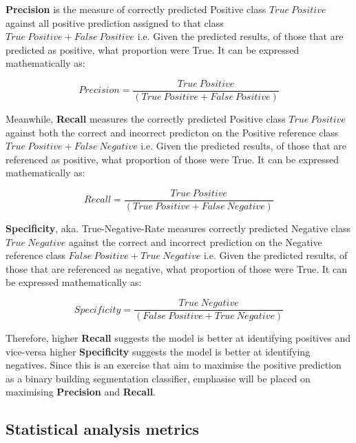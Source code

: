 \documentclass[11pt, a4paper, twoside]{report}
\begin{document}
\textbf{Precision} is the measure of correctly predicted Positive class $True\ Positive$ against all positive prediction assigned to that class $True\ Positive + False\ Positive$ i.e. Given the predicted results, of those that are predicted as positive, what proportion were True. It can be expressed mathematically as:

\begin{equation}
  Precision = \frac{True\ Positive} {(True\ Positive + False\ Positive)}
\end{equation}

Meanwhile, \textbf{Recall} measures the correctly predicted Positive class $True\ Positive$ against both the correct and incorrect predicton on the Positive reference class $True\ Positive + False\ Negative$ i.e. Given the predicted results, of those that are referenced as positive, what proportion of those were True. It can be expressed mathematically as:

\begin{equation}
  Recall = \frac{True\ Positive} {(True\ Positive + False\ Negative)}
\end{equation}

\textbf{Specificity}, aka. True-Negative-Rate measures correctly predicted Negative class $True\ Negative$ against the correct and incorrect prediction on the Negative reference class $False\ Positive + True\ Negative$ i.e. Given the predicted results, of those that are referenced as negative, what proportion of those were True. It can be expressed mathematically as:

\begin{equation}
  Specificity = \frac{True\ Negative} {(False\ Positive + True\ Negative)}
\end{equation}

Therefore, higher \textbf{Recall} suggests the model is better at identifying positives and vice-versa higher \textbf{Specificity} suggests the model is better at identifying negatives. Since this is an exercise that aim to maximise the positive prediction as a binary building segmentation classifier, emphasise will be placed on maximising \textbf{Precision} and \textbf{Recall}.\\\par

\subsection{Statistical analysis metrics}\label{2ndorder}
\end{document}
